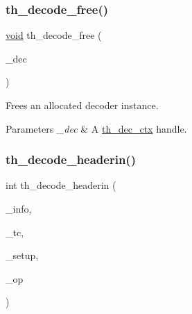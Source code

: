 \subsubsection{\texorpdfstring{th\+\_\+decode\+\_\+free()}{th\_decode\_free()}}
{\footnotesize\ttfamily \hyperlink{png_8h_ac9c84fa68bbad002983e35ce3663c686}{void} th\+\_\+decode\+\_\+free (\begin{DoxyParamCaption}\item[{\hyperlink{theoradec_8h_a843d70bb02563885a8d54b9c1a781729}{th\+\_\+dec\+\_\+ctx} $\ast$}]{\+\_\+dec }\end{DoxyParamCaption})}

Frees an allocated decoder instance. 
\begin{DoxyParams}{Parameters}
{\em \+\_\+dec} & A \hyperlink{theoradec_8h_a843d70bb02563885a8d54b9c1a781729}{th\+\_\+dec\+\_\+ctx} handle. \\
\hline
\end{DoxyParams}
\mbox{\label{group__decfuncs_ga006d01d36fbe64768c571e6a12b7fc50}} 
\subsubsection{\texorpdfstring{th\+\_\+decode\+\_\+headerin()}{th\_decode\_headerin()}}
{\footnotesize\ttfamily int th\+\_\+decode\+\_\+headerin (\begin{DoxyParamCaption}\item[{\hyperlink{structth__info}{th\+\_\+info} $\ast$}]{\+\_\+info,  }\item[{\hyperlink{structth__comment}{th\+\_\+comment} $\ast$}]{\+\_\+tc,  }\item[{\hyperlink{theoradec_8h_ab71cd2657455cc27d6c0127c66a89f28}{th\+\_\+setup\+\_\+info} $\ast$$\ast$}]{\+\_\+setup,  }\item[{\hyperlink{structogg__packet}{ogg\+\_\+packet} $\ast$}]{\+\_\+op }\end{DoxyParamCaption})}

